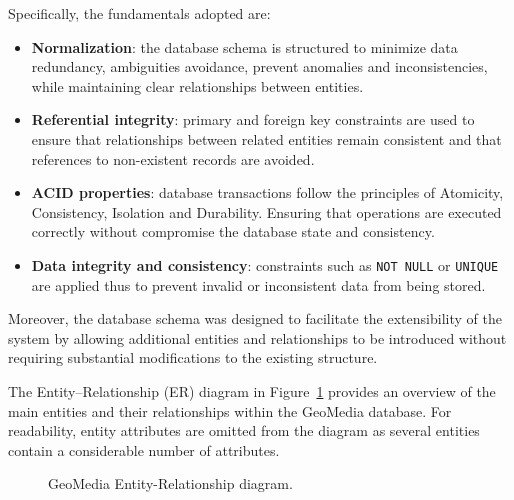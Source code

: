 Specifically, the fundamentals adopted are:

\begin{itemize}

    \item \textbf{Normalization}: the database schema is structured to minimize data redundancy, ambiguities avoidance, prevent anomalies and inconsistencies, while maintaining clear relationships between entities.

    \item \textbf{Referential integrity}: primary and foreign key constraints are used to ensure that relationships between related entities remain consistent and that references to non-existent records are avoided.

    \item \textbf{ACID properties}: database transactions follow the principles of Atomicity, Consistency, Isolation and Durability. Ensuring that operations are executed correctly without compromise the database state and consistency.

    \item \textbf{Data integrity and consistency}: constraints such as \texttt{NOT NULL} or \texttt{UNIQUE} are applied thus to prevent invalid or inconsistent data from being stored.

\end{itemize}

Moreover, the database schema was designed to facilitate the extensibility of the system by allowing additional entities and relationships to be introduced without requiring substantial modifications to the existing structure.

The Entity–Relationship (ER) diagram in Figure~\ref{fig:geomedia_ER} provides an overview of the main entities and their relationships within the GeoMedia database. For readability, entity attributes are omitted from the diagram as several entities contain a considerable number of attributes.

\begin{figure}[H]
    \centering
    
    \caption{GeoMedia Entity-Relationship diagram.}
    \label{fig:geomedia_ER}
\end{figure}

